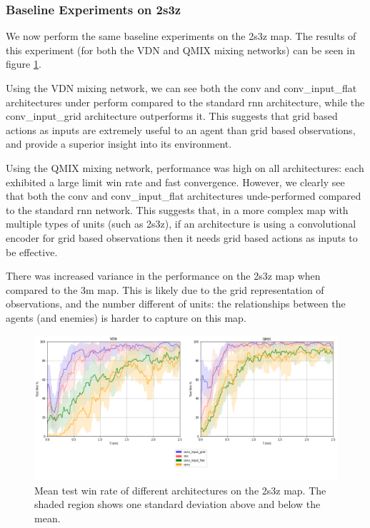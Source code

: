 \subsubsection{Baseline Experiments on 2s3z}
We now perform the same baseline experiments on the 2s3z map. The results of this experiment (for both the VDN and QMIX mixing networks) can be seen in figure \ref{fig:2s3z_all}.

Using the VDN mixing network, we can see both the conv and conv\_input\_flat architectures under perform compared to the standard rnn architecture, while the conv\_input\_grid architecture outperforms it. This suggests that grid based actions as inputs are extremely useful to an agent than grid based observations, and provide a superior insight into its environment.


Using the QMIX mixing network, performance was high on all architectures: each exhibited a large limit win rate and fast convergence. However, we clearly see that both the conv and conv\_input\_flat architectures unde-performed compared to the standard rnn network. This suggests that, in a more complex map with multiple types of units (such as 2s3z), if an architecture is using a convolutional encoder for grid based observations then it needs grid based actions as inputs to be effective. 

There was increased variance in the performance on the 2s3z map when compared to the 3m map. This is likely due to the grid representation of observations, and the number different of units: the relationships between the agents (and enemies) is harder to capture on this map.

\begin{figure}[h]
    \centering
    \hbox{\hspace{-6.35em}\includegraphics[width=1.34\textwidth]{images/graphs/all2s3z.png}}
    \caption{Mean test win rate of different architectures on the 2s3z map. The shaded region shows one standard deviation above and below the mean.}
    \label{fig:2s3z_all}
\end{figure}





